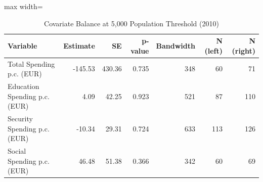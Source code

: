 \begin{table}[!h]
\centering
\caption{\label{tab:balance}Covariate Balance at 5,000 Population Threshold (2010)}
\centering
\begin{adjustbox}{max width=\textwidth}
\begin{tabular}[t]{lrrrrrr}
\toprule
Variable & Estimate & SE & p-value & Bandwidth & N (left) & N (right)\\
\midrule
Total Spending p.c. (EUR) & -145.53 & 430.36 & 0.735 & 348 & 60 & 71\\
Education Spending p.c. (EUR) & 4.09 & 42.25 & 0.923 & 521 & 87 & 110\\
Security Spending p.c. (EUR) & -10.34 & 29.31 & 0.724 & 633 & 113 & 126\\
Social Spending p.c. (EUR) & 46.48 & 51.38 & 0.366 & 342 & 60 & 69\\
\bottomrule
\end{tabular}
\end{adjustbox}
\end{table}
